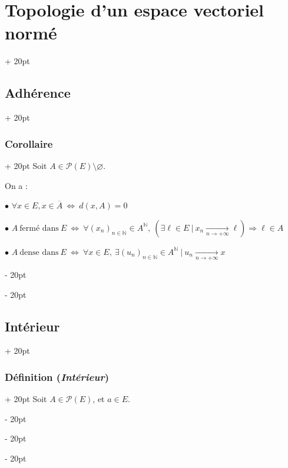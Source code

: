 \documentclass[a4paper, 12pt, twoside]{article}
\newcommand{\N}{\mathbb{N}} %
\newcommand{\cj}[1]{\overline{#1}} %
\newcommand{\tendsto}[1]{\xrightarrow[#1]{}}
\newcommand{\ssi}{\ \Leftrightarrow \ }
\newcommand{\ind}[1][20pt]{\advance\leftskip + #1}
\newcommand{\deind}[1][20pt]{\advance\leftskip - #1}
\newenvironment{indt}[2][20pt]{#2 \par \ind[#1]}{\par \deind} %
\begin{document}
\begin{indt}{\section{Topologie d'un espace vectoriel normé}}
\begin{indt}{\subsection{Adhérence}}
            \vspace{12pt}
            
            \begin{indt}{\subsubsection{Corollaire}}
                Soit $A \in \mathcal P(E) \setminus \varnothing$.

                On a :

                \vspace{6pt}
                
                $\bullet$ $\forall x \in E, x \in \cj A \ssi d(x, A) = 0$

                $\bullet$
                $
                    A\ \text{fermé dans}\ E
                    \ssi
                    \forall (x_n)_{n \in \N} \in A^\N,\
                    (\exists \ell \in E\ |\ x_n \tendsto{n \to +\infty} \ell) \Rightarrow \ell \in A
                $

                $\bullet$
                $
                    A\ \text{dense dans}\ E
                    \ssi
                    \forall x \in E,\
                    \exists (u_n)_{n \in \N} \in A^\N\ |\ u_n \tendsto{n \to +\infty} x
                $
            \end{indt}
        \end{indt}

        \vspace{12pt}
        
        \begin{indt}{\subsection{Intérieur}}
            \begin{indt}{\subsubsection{Définition (\textit{Intérieur})}}
                Soit $A \in \mathcal P(E)$, et $a \in E$.


\end{indt}
\end{indt}
\end{indt}
\end{document}
